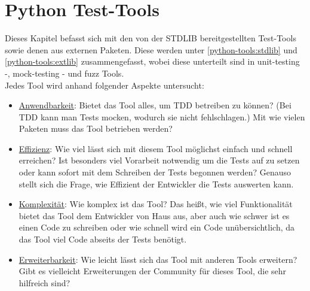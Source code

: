 \section{Python Test-Tools}\label{python-tools}

Dieses Kapitel befasst sich mit den von der STDLIB bereitgestellten Test-Tools
sowie denen aus externen Paketen.
Diese werden unter \ref{python-tools:stdlib} und \ref{python-tools:extlib}
zusammengefasst, wobei diese unterteilt sind in unit-testing -,
\gls{mock}-testing - und \gls{fuzz} Tools.
\newline
\\
Jedes Tool wird anhand folgender Aspekte untersucht:
\begin{itemize}
    \item \underline{Anwendbarkeit}:\newline
    Bietet das Tool alles, um TDD betreiben zu können? (Bei TDD
    kann man Tests \gls{mock}en, wodurch sie nicht fehlschlagen.)
    Mit wie vielen Paketen muss das Tool betrieben werden?
    
    \item \underline{Effizienz}:\newline
    Wie viel lässt sich mit diesem Tool möglichst einfach und
    schnell erreichen? Ist besonders viel Vorarbeit notwendig um die Tests
    auf zu setzen oder kann sofort mit dem Schreiben der Tests begonnen
    werden?
    \newline
    Genauso stellt sich die Frage, wie Effizient der Entwickler die Tests
    auswerten kann.
    
    \item \underline{Komplexität}:\newline
    Wie komplex ist das Tool? Das heißt, wie viel Funktionalität
    bietet das Tool dem Entwickler von Haus aus, aber auch wie schwer
    ist es einen Code zu schreiben oder wie schnell wird ein Code unübersichtlich, da
    das Tool viel Code abseits der Tests benötigt.
    
    \item \underline{Erweiterbarkeit}:\newline
    Wie leicht lässt sich das Tool mit anderen Tools erweitern?
    Gibt es vielleicht Erweiterungen der Community für dieses Tool, die sehr
    hilfreich sind?
\end{itemize}




